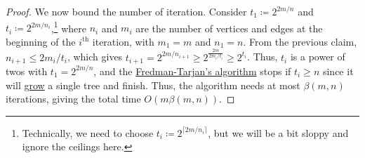 \begin{proof}
	We now bound the number of iteration. Consider \(t_1 \coloneqq 2^{2m / n}\) and \(t_i \coloneqq 2^{2m / n_i}\),\footnote{Technically, we need to choose \(t_i \coloneqq 2^{\lceil 2m / n_i \rceil }\), but we will be a bit sloppy and ignore the ceilings here.} where \(n_i\) and \(m_i\) are the number of vertices and edges at the beginning of the \(i^{\text{th} }\) iteration, with \(m_1 = m\) and \(n_1 = n\). From the previous claim, \(n_{i+1} \leq 2m_i / t_i\), which gives \(t_{i+1} = 2^{2m / n_{i+1}} \geq 2^{\frac{2m}{2m_i / t_i}} \geq 2^{t_i}\). Thus, \(t_i\) is a power of twos with \(t_1 = 2^{2m / n}\), and the \hyperref[algo:Fredman-Tarjan]{Fredman-Tarjan's algorithm} stops if \(t_i \geq n\) since it will \hyperref[algo:Fredman-Tarjan-I]{grow} a single tree and finish. Thus, the algorithm needs at most \(\beta (m, n)\) iterations, giving the total time \(O(m \beta (m, n))\).
\end{proof}